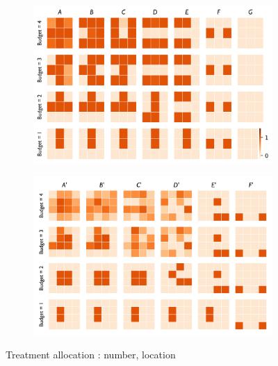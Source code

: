 \begin{figure}[H]
\begin{subfigure}[b]{0.48\textwidth}
         \caption{}
         \label{fig:treatments_number4}
    \end{subfigure}
    \hfill
     \begin{subfigure}[b]{0.44\textwidth}
         \centering
         \includegraphics[width=\textwidth]{figures/wildland/treatments3.png}
         \caption{}
         \label{fig:treatments_pattern3}
     \end{subfigure}
     \begin{subfigure}[b]{0.44\textwidth}
         \centering
         \includegraphics[width=\textwidth]{figures/wildland/treatments4.png}
         \caption{}
         \label{fig:treatments_pattern4}
     \end{subfigure}    
        \caption{Treatment allocation : number, location}
        \label{fig:treatments}
\end{figure}